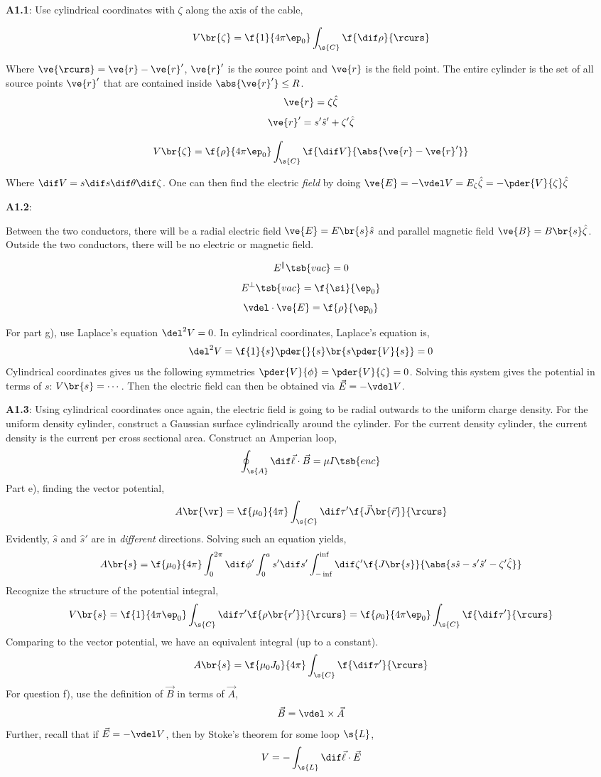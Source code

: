 \documentclass{article}
\begin{document}
\textbf{A1.1}: Use cylindrical coordinates with $\zeta$ along the axis of the cable,

\[ V\br{\zeta} = \f{1}{4 \pi \ep_0} \int_{\s{C}}\f{\dif \rho}{\rcurs} \]

Where $\ve{\rcurs} = \ve{r} - \ve{r}'$, $\ve{r}'$ is the source point and $\ve{r}$ is the field point. The entire cylinder is the set of all source points $\ve{r}'$ that are contained inside $\abs{\ve{r}'} \leq R$.
\[ \ve{r} = \zeta \hat{\zeta} \]
\[ \ve{r}' = s' \hat{s}' + \zeta' \hat{\zeta} \]

\[ V\br{\zeta} = \f{\rho}{4 \pi \ep_0} \int_{\s{C}}\f{\dif V}{\abs{\ve{r} - \ve{r}'}} \]

Where $ \dif V = s \dif s \dif \theta \dif \zeta$. One can then find the electric \textit{field} by doing $\ve{E} = - \vdel V = E_{\zeta} \hat{\zeta} = -\pder{V}{\zeta} \hat{\zeta}$

\textbf{A1.2}:

Between the two conductors, there will be a radial electric field $\ve{E} = E\br{s} \hat{s}$ and parallel magnetic field $\ve{B} = B\br{s} \hat{\zeta} $. Outside the two conductors, there will be no electric or magnetic field.

\[ E^{\parallel}\tsb{vac} = 0 \]
\[ E^{\perp}\tsb{vac} = \f{\si}{\ep_0} \]
\[ \vdel \cdot \ve{E} = \f{\rho}{\ep_0} \]

For part g), use Laplace's equation $\del^2 V = 0$. In cylindrical coordinates, Laplace's equation is,
\[ \del^2 V = \f{1}{s} \pder{}{s}\br{s \pder{V}{s}} = 0 \]
Cylindrical coordinates gives us the following symmetries $\pder{V}{\phi} = \pder{V}{\zeta} = 0$.
Solving this system gives the potential in terms of $s$: $V\br{s} = \cdots$. Then the electric field can then be obtained via $\vec{E} = - \vdel V$.

\textbf{A1.3}: Using cylindrical coordinates once again, the electric field is going to be radial outwards to the uniform charge density. For the uniform density cylinder, construct a Gaussian surface cylindrically around the cylinder. For the current density cylinder, the current density is the current per cross sectional area. Construct an Amperian loop,
\[ \oint_{\s{A}} \dif \vec{\ell} \cdot \vec{B} = \mu I\tsb{enc}  \]
Part e), finding the vector potential,
\[ A\br{\vr} = \f{\mu_0}{4\pi} \int_{\s{C}} \dif \tau' \f{\vec{J}\br{\vec{r}}}{\rcurs} \]
Evidently, $\hat{s}$ and $\hat{s}'$ are in \textit{different} directions.
Solving such an equation yields,
\[ A\br{s} = \f{\mu_0}{4 \pi} \int_{0}^{2\pi} \dif \phi' \int_{0}^{a} s' \dif s' \int_{-\inf}^{\inf} \dif \zeta' \f{J\br{s}}{\abs{s \hat{s} - s' \hat{s}' - \zeta' \hat\zeta}} \]
Recognize the structure of the potential integral,
\[ V\br{s} = \f{1}{4\pi \ep_0} \int_{\s{C}} \dif \tau' \f{\rho\br{r'}}{\rcurs} = \f{\rho_0}{4 \pi \ep_0} \int_{\s{C}} \f{\dif \tau'}{\rcurs}\]
Comparing to the vector potential, we have an equivalent integral (up to a constant).
\[ A\br{s} = \f{\mu_0 J_0}{4 \pi} \int_{\s{C}} \f{\dif \tau'}{\rcurs} \]
For question f), use the definition of $\vec{B}$ in terms of $\vec{A}$,
\[ \vec{B} = \vdel \times \vec{A} \]
Further, recall that if $\vec{E} = -\vdel V$, then by Stoke's theorem for some loop $\s{L}$,
\[ V = - \int_{\s{L}} \dif \vec{\ell} \cdot \vec{E} \]
\end{document}
